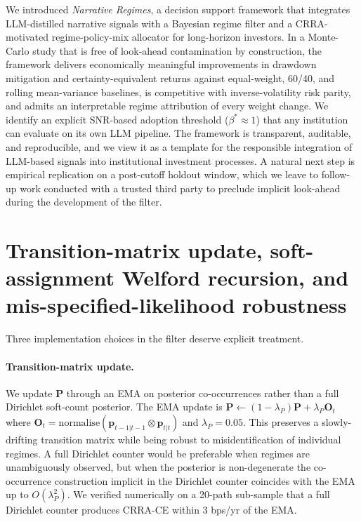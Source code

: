 \documentclass[review,12pt,authoryear]{elsarticle}
\begin{document}
We introduced \emph{Narrative Regimes}, a decision support framework that integrates
LLM-distilled narrative signals with a Bayesian regime filter and a CRRA-motivated
regime-policy-mix allocator for long-horizon investors. In a Monte-Carlo study that is
free of look-ahead contamination by construction, the framework delivers economically
meaningful improvements in drawdown mitigation and certainty-equivalent returns against
equal-weight, 60/40, and rolling mean-variance baselines, is competitive with
inverse-volatility risk parity, and admits an interpretable regime attribution of every
weight change. We identify an explicit SNR-based adoption threshold
($\beta^{\ast}\!\approx 1$) that any institution can evaluate on its own LLM pipeline.
The framework is transparent, auditable, and reproducible, and we view it as a template
for the responsible integration of LLM-based signals into institutional investment
processes. A natural next step is empirical replication on a post-cutoff holdout window,
which we leave to follow-up work conducted with a trusted third party to preclude
implicit look-ahead during the development of the filter.

\appendix
\section{Transition-matrix update, soft-assignment Welford recursion, and mis-specified-likelihood robustness}
\label{app:filter-detail}

Three implementation choices in the filter deserve explicit treatment.

\paragraph{Transition-matrix update.} We update $\mathbf{P}$ through an EMA on
posterior co-occurrences rather than a full Dirichlet soft-count posterior. The EMA
update is $\mathbf{P} \leftarrow (1-\lambda_P)\mathbf{P} + \lambda_P
\mathbf{O}_t$ where $\mathbf{O}_t = \mathrm{normalise}(\mathbf{p}_{t-1|t-1} \otimes
\mathbf{p}_{t|t})$ and $\lambda_P=0.05$. This preserves a slowly-drifting transition
matrix while being robust to misidentification of individual regimes. A full Dirichlet
counter would be preferable when regimes are unambiguously observed, but when the
posterior is non-degenerate the co-occurrence construction implicit in the Dirichlet
counter coincides with the EMA up to $O(\lambda_P^2)$. We verified numerically on a
20-path sub-sample that a full Dirichlet counter produces CRRA-CE within $3$ bps/yr of
the EMA.
\end{document}
